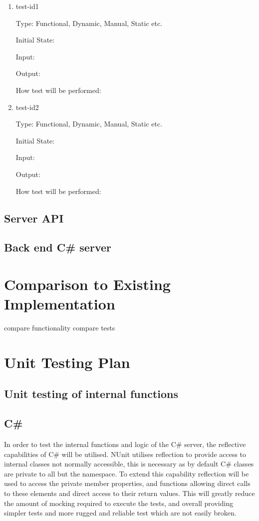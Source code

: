 \documentclass[12pt, titlepage]{article}
\begin{document}
\begin{enumerate}

\item{test-id1\\}

Type: Functional, Dynamic, Manual, Static etc.
					
Initial State: 
					
Input: 
					
Output: 
					
How test will be performed: 
					
\item{test-id2\\}

Type: Functional, Dynamic, Manual, Static etc.
					
Initial State: 
					
Input: 
					
Output: 
					
How test will be performed: 

\end{enumerate}

\subsection{Server API}

\subsection{Back end C\# server}

	
\section{Comparison to Existing Implementation}	
compare functionality
compare tests

				
\section{Unit Testing Plan}
		
\subsection{Unit testing of internal functions}

\subsection{C\#}
In order to test the internal functions and logic of the C\# server, the
reflective capabilities of C\# will be utilised. NUnit utilises reflection to
provide access to internal classes not normally accessible, this is necessary
as by default C\# classes are private to all but the namespace. To extend this
capability reflection will be used to access the private member properties, and
functions allowing direct calls to these elements and direct access to their
return values. This will greatly reduce the amount of mocking required to
execute the tests, and overall providing simpler tests and more rugged and
reliable test which are not easily broken. 
\end{document}
